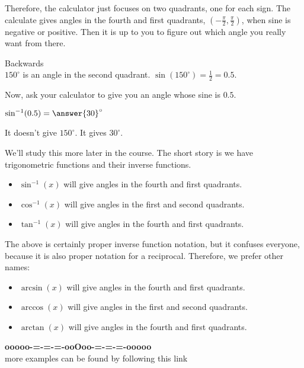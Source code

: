 \documentclass{ximera}
\begin{document}
Therefore, the calculator just focuses on two quadrants, one for each sign.  The calculate gives angles in the fourth  and first quadrants, $\left( -\frac{\pi}{2}, \frac{\pi}{2}   \right)$, when sine is negative or positive.  Then it is up to you to figure out which angle you really want from there.












\begin{question} Backwards \\

$150^{\circ}$ is an angle in the second quadrant. $\sin(150^{\circ}) = \frac{1}{2} = 0.5$.


Now, ask your calculator to give you an angle whose sine is $0.5$.


$\sin^{-1}(0.5) = \answer{30}^{\circ}$


It doesn't give $150^{\circ}$.  It gives $30^{\circ}$.

\end{question}




We'll study this more later in the course.  The short story is we have trigonometric functions and their inverse functions.




\begin{itemize}
\item $\sin^{-1}(x)$ will give angles in the fourth and first quadrants.
\item $\cos^{-1}(x)$ will give angles in the first and second quadrants.
\item $\tan^{-1}(x)$ will give angles in the fourth and first quadrants.
\end{itemize}


The above is certainly proper inverse function notation, but it confuses everyone, because it is also proper notation for a reciprocal.  Therefore, we prefer other names:




\begin{itemize}
\item $\arcsin(x)$ will give angles in the fourth and first quadrants.
\item $\arccos(x)$ will give angles in the first and second quadrants.
\item $\arctan(x)$ will give angles in the fourth and first quadrants.
\end{itemize}





\begin{center}
\textbf{\textcolor{green!50!black}{ooooo-=-=-=-ooOoo-=-=-=-ooooo}} \\

more examples can be found by following this link\\ 

\end{center}
\end{document}
